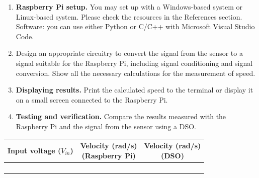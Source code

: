\begin{procedure}
  \begin{enumerate}
    \item \textbf{Raspberry Pi setup.} You may set up with a Windows-based system or Linux-based system. Please check the resources in the References section. Software: you can use either Python or C/C++ with Microsoft Visual Studio Code.
    \item Design an appropriate circuitry to convert the signal from the sensor to a signal suitable for the Raspberry Pi, including signal conditioning and signal conversion. Show all the necessary calculations for the measurement of speed.
    \item \textbf{Displaying results.} Print the calculated speed to the terminal or display it on a small screen connected to the Raspberry Pi.
    \item \textbf{Testing and verification.} Compare the results measured with the Raspberry Pi and the signal from the sensor using a DSO.
  \end{enumerate}

  \needspace{4cm}
  \begin{boxedtable}
    \label{tab:exp7rpi-results}
    \centering
    \begin{tabular}{ccc}
      \toprule
      \shortstack{Input voltage\\ ($V_{in}$)} & \shortstack{Velocity (rad/s)\\(Raspberry Pi)} & \shortstack{Velocity (rad/s)\\(DSO)} \\
      \midrule
                                              &                                               &                                      \\
                                              &                                               &                                      \\
                                              &                                               &                                      \\
                                              &                                               &                                      \\
      \bottomrule
    \end{tabular}
  \end{boxedtable}
\end{procedure}

